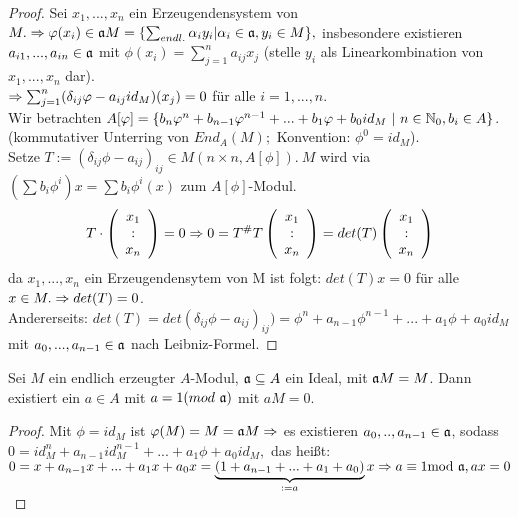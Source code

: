 \begin{proof}
	Sei $x_1,...,x_n $ ein Erzeugendensystem von $M. \\
	\Rightarrow \varphi(x_i) \in \mathfrak{a} M = \{ \sum_{endl.} \alpha_i y_i | \alpha_i \in \mathfrak{a}, y_i \in M \},$ insbesondere existieren $a_{i1},...,a_{in} \in \mathfrak{a} $ mit $ \phi(x_i) = \sum_{j=1}^{n} a_{ij} x_j$ (stelle $y_i$ als Linearkombination von $x_1,...,x_n$ dar). \\
	$\Rightarrow \sum_{j=1}^{n} ( \delta_{ij}\varphi - a_{ij}id_M)(x_j) = 0 $ für alle $i=1,...,n $. \\ Wir betrachten $ A[\varphi] = \{b_n \varphi^n + b_{n-1}\varphi^{n-1} +...+b_1\varphi + b_0 id_M \ | \ n \in \mathbb{N}_0, b_i \in A \} $. (kommutativer Unterring von $End_A(M); $ Konvention: $\phi^0 = id_M $). \\
	Setze $T:= ( \delta_{ij} \phi - a_{ij})_{ij} \in M(n \times n, A[\phi]). \ M $ wird via $ (\sum b_i \phi^i)x = \sum b_i \phi^i(x) $ zum $A[\phi]$-Modul. \\
	$$T \cdot \left( \begin{array}{c}x_1\\:\\ x_n\end{array} \right) = 0
	\Rightarrow  0 = T^{\#}T \left( \begin{array}{c}x_1\\:\\ x_n\end{array} \right)= det(T)\left( \begin{array}{c}x_1\\:\\ x_n\end{array} \right) $$ da $x_1,...,x_n $ ein Erzeugendensytem von M ist folgt: $ det(T) x = 0 $ für alle $x \in M. \\
	\Rightarrow det(T) = 0 $. \\
	Andererseits: $det(T) = det(\delta_{ij} \phi - a_{ij})_{ij}) = \phi^{n} + a_{n-1}\phi^{n-1}+...+ a_1\phi + a_0id_M $ mit $a_0,...,a_{n-1} \in \mathfrak{a} $ nach Leibniz-Formel.
\end{proof}
\begin{fo} \label{11.15}
	Sei $M$ ein endlich erzeugter $A$-Modul, $\mathfrak{a} \subseteq A $ ein Ideal, mit $\mathfrak{a} M = M$. 
	Dann existiert ein $a \in A $ mit $ a = 1 (mod \ \mathfrak{a})$ mit $ aM = 0. $
\end{fo}
\begin{proof}
	Mit $ \phi = id_M$ ist $\varphi(M) = M = \mathfrak{a} M \Rightarrow$ es existieren  $a_0,..,a_{n-1} \in \mathfrak{a}$, sodass $0 = id_M^{n} + a_{n-1}id_M^{n-1}+...+ a_1\phi + a_0id_M, $ das heißt: 
	$ 0 = x + a_{n-1}x +...+ a_1x+a_0x = \underbrace{(1+ a_{n-1}+...+a_1 +a_0)}_{:=a} x \Rightarrow a \equiv 1 \text{mod} \  \mathfrak{a}, ax =0 $
\end{proof}
